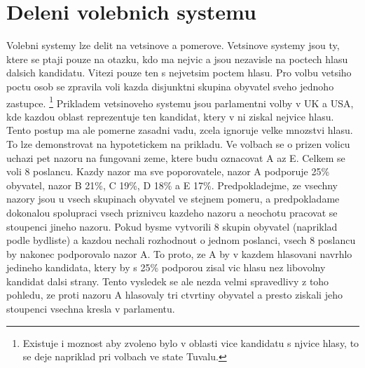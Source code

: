 \documentclass[12pt,a4paper]{report}
\begin{document}
\section{Deleni volebnich systemu}
Volebni systemy lze delit na vetsinove a pomerove. Vetsinove systemy jsou ty, ktere se ptaji pouze na otazku, kdo ma nejvic a jsou nezavisle na poctech hlasu dalsich kandidatu.
Vitezi pouze ten s nejvetsim poctem hlasu.
Pro volbu vetsiho poctu osob se zpravila voli kazda disjunktni skupina obyvatel sveho jednoho zastupce.
\footnote{Existuje i moznost aby zvoleno bylo v oblasti vice kandidatu s njvice hlasy, to se deje napriklad pri volbach ve state Tuvalu.\autocite{TUV}}
Prikladem vetsinoveho systemu jsou parlamentni volby v UK a USA, kde kazdou oblast reprezentuje ten kandidat, ktery v ni ziskal nejvice hlasu.
Tento postup ma ale pomerne zasadni vadu, zcela ignoruje velke mnozstvi hlasu.
To lze demonstrovat na hypotetickem na prikladu. Ve volbach se o prizen volicu uchazi pet nazoru na fungovani zeme, ktere budu oznacovat A az E.
Celkem se voli 8 poslancu.
Kazdy nazor ma sve poporovatele, nazor A podporuje 25\% obyvatel, nazor B 21\%, C 19\%, D 18\% a E 17\%.
Predpokladejme, ze vsechny nazory jsou u vsech skupinach obyvatel ve stejnem pomeru, a predpokladame dokonalou spolupraci vsech priznivcu kazdeho nazoru a neochotu pracovat se stoupenci jineho nazoru.
Pokud bysme vytvorili 8 skupin obyvatel (napriklad podle bydliste) a kazdou nechali rozhodnout o jednom poslanci, vsech 8 poslancu by nakonec podporovalo nazor A.
To proto, ze A by v kazdem hlasovani navrhlo jedineho kandidata, ktery by s 25\% podporou zisal vic hlasu nez libovolny kandidat dalsi strany. 
Tento vysledek se ale nezda velmi spravedlivy z toho pohledu, ze proti nazoru A hlasovaly tri ctvrtiny obyvatel a presto ziskali jeho stoupenci vsechna kresla v parlamentu.
\end{document}
